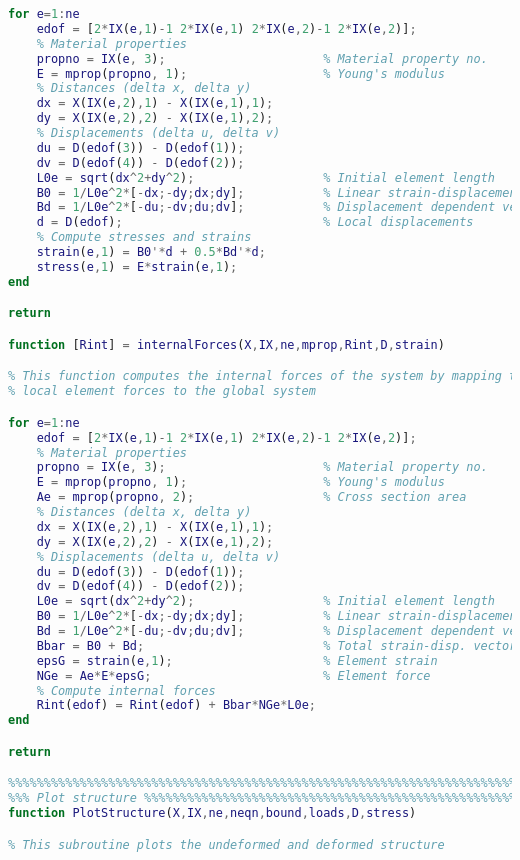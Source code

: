 \begin{lstlisting}[language=Matlab, caption = FE implementation for geometrical non-linearity, label=lst:CodeGNA]
for e=1:ne
    edof = [2*IX(e,1)-1 2*IX(e,1) 2*IX(e,2)-1 2*IX(e,2)];
    % Material properties
    propno = IX(e, 3);                      % Material property no.
    E = mprop(propno, 1);                   % Young's modulus
    % Distances (delta x, delta y)
    dx = X(IX(e,2),1) - X(IX(e,1),1);
    dy = X(IX(e,2),2) - X(IX(e,1),2);
    % Displacements (delta u, delta v)
    du = D(edof(3)) - D(edof(1));
    dv = D(edof(4)) - D(edof(2));
    L0e = sqrt(dx^2+dy^2);                  % Initial element length
    B0 = 1/L0e^2*[-dx;-dy;dx;dy];           % Linear strain-displacement v.
    Bd = 1/L0e^2*[-du;-dv;du;dv];           % Displacement dependent vector
    d = D(edof);                            % Local displacements
    % Compute stresses and strains
    strain(e,1) = B0'*d + 0.5*Bd'*d;
    stress(e,1) = E*strain(e,1);
end

return

function [Rint] = internalForces(X,IX,ne,mprop,Rint,D,strain)

% This function computes the internal forces of the system by mapping the 
% local element forces to the global system

for e=1:ne
    edof = [2*IX(e,1)-1 2*IX(e,1) 2*IX(e,2)-1 2*IX(e,2)];
    % Material properties
    propno = IX(e, 3);                      % Material property no.
    E = mprop(propno, 1);                   % Young's modulus
    Ae = mprop(propno, 2);                  % Cross section area
    % Distances (delta x, delta y)
    dx = X(IX(e,2),1) - X(IX(e,1),1);
    dy = X(IX(e,2),2) - X(IX(e,1),2);
    % Displacements (delta u, delta v)
    du = D(edof(3)) - D(edof(1));
    dv = D(edof(4)) - D(edof(2));
    L0e = sqrt(dx^2+dy^2);                  % Initial element length
    B0 = 1/L0e^2*[-dx;-dy;dx;dy];           % Linear strain-displacement v.
    Bd = 1/L0e^2*[-du;-dv;du;dv];           % Displacement dependent vector
    Bbar = B0 + Bd;                         % Total strain-disp. vector
    epsG = strain(e,1);                     % Element strain
    NGe = Ae*E*epsG;                        % Element force
    % Compute internal forces
    Rint(edof) = Rint(edof) + Bbar*NGe*L0e; 
end

return

%%%%%%%%%%%%%%%%%%%%%%%%%%%%%%%%%%%%%%%%%%%%%%%%%%%%%%%%%%%%%%%%%%%%%%%%%%%
%%% Plot structure %%%%%%%%%%%%%%%%%%%%%%%%%%%%%%%%%%%%%%%%%%%%%%%%%%%%%%%%
function PlotStructure(X,IX,ne,neqn,bound,loads,D,stress)

% This subroutine plots the undeformed and deformed structure


\end{lstlisting}
